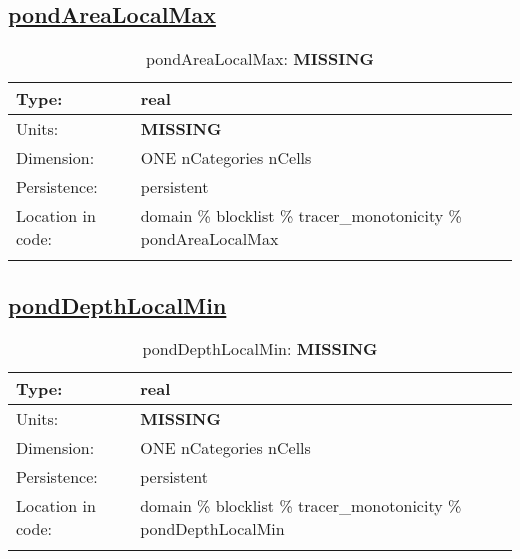 \subsection[pondAreaLocalMax]{\hyperref[sec:var_tab_tracer_monotonicity]{pondAreaLocalMax}}
\label{subsec:var_sec_tracer_monotonicity_pondAreaLocalMax}
\begin{center}
\begin{longtable}{| p{2.0in} | p{4.0in} |}
        \hline 
        Type: & real \\
        \hline 
        Units: & {\bf \color{red} MISSING} \\
        \hline 
        Dimension: & ONE nCategories nCells \\
        \hline 
        Persistence: & persistent \\
        \hline 
         Location in code: & domain \% blocklist \% tracer\_monotonicity \% pondAreaLocalMax \\
         \hline 
    \caption{pondAreaLocalMax: {\bf \color{red} MISSING}}
\end{longtable}
\end{center}
\subsection[pondDepthLocalMin]{\hyperref[sec:var_tab_tracer_monotonicity]{pondDepthLocalMin}}
\label{subsec:var_sec_tracer_monotonicity_pondDepthLocalMin}
\begin{center}
\begin{longtable}{| p{2.0in} | p{4.0in} |}
        \hline 
        Type: & real \\
        \hline 
        Units: & {\bf \color{red} MISSING} \\
        \hline 
        Dimension: & ONE nCategories nCells \\
        \hline 
        Persistence: & persistent \\
        \hline 
         Location in code: & domain \% blocklist \% tracer\_monotonicity \% pondDepthLocalMin \\
         \hline 
    \caption{pondDepthLocalMin: {\bf \color{red} MISSING}}
\end{longtable}
\end{center}
